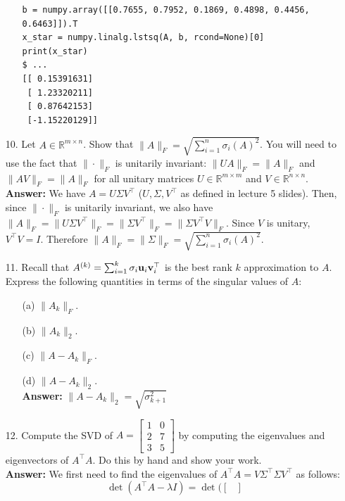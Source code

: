 \documentclass{article}
\newcommand{\bu}{{\bf u}}
\newcommand{\bv}{{\bf v}}
\begin{document}
\begin{itemize}
\begin{itemize}
\begin{verbatim}
b = numpy.array([[0.7655, 0.7952, 0.1869, 0.4898, 0.4456, 0.6463]]).T
x_star = numpy.linalg.lstsq(A, b, rcond=None)[0]
print(x_star)
$ ...
[[ 0.15391631]
 [ 1.23320211]
 [ 0.87642153]
 [-1.15220129]]
              \end{verbatim}
            \end{itemize}
      \item [10.] Let $A\in\mathbb{R}^{m\times n}$. Show that $\|A\|_{F} = \sqrt{\sum_{i=1}^{n}\sigma_{i}(A)^{2}}$. You will need to use the fact that $\|\cdot\|_{F}$ is unitarily invariant: $\|UA\|_{F} = \|A\|_{F}$ and $\|AV\|_{F} = \|A\|_{F}$ for all unitary matrices $U\in\mathbb{R}^{m\times m}$ and $V\in\mathbb{R}^{n\times n}$.\\
            \textbf{Answer:} We have $A=U\Sigma V^{\top}$ ($U,\Sigma,V^{\top}$ as defined in lecture 5 slides). Then, since $\|\cdot\|_{F}$ is unitarily invariant, we also have $\|A\|_F=\|U\Sigma V^{\top}\|_F=\|\Sigma V^{\top}\|_F=\|\Sigma V^{\top}V\|_F$. Since $V$ is unitary, $V^{\top}V=I$. Therefore $\|A\|_F=\|\Sigma\|_F=\sqrt{\sum_{i=1}^{n}\sigma_{i}(A)^{2}}$.
      \item [11.] Recall that $A^{(k)} = \sum_{i=1}^{k} \sigma_i\bu_{i}\bv_{i}^{\top}$ is the best rank $k$ approximation to $A$. Express the following quantities in terms of the singular values of $A$:
            \begin{itemize}
                  \item [(a)] $\|A_{k}\|_{F}$.
                  \item [(b)] $\|A_{k}\|_{2}$.
                  \item [(c)] $\|A - A_{k}\|_{F}$.
                  \item [(d)] $\|A - A_{k}\|_{2}$.\\
                        \textbf{Answer:} $\|A - A_{k}\|_{2}=\sqrt{\sigma_{k+1}^2}$
            \end{itemize}
      \item [12.] Compute the SVD of $\displaystyle A = \left[\begin{matrix} 1 & 0 \\ 2 & 7 \\ 3 & 5 \end{matrix}\right]$ by computing the eigenvalues and eigenvectors of $A^{\top}A$. Do this by hand and show your work.\\
            \textbf{Answer:} We first need to find the eigenvalues of $A^{\top}A=V\Sigma^{\top}\Sigma V^{\top}$ as follows:
            \[
                  \det(A^{\top}A-\lambda I)=\det(\begin{bmatrix}

\end{bmatrix}\]
\end{itemize}
\end{document}
